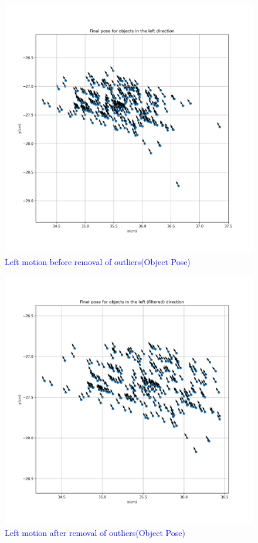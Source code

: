     \begin{figure}[H] 
            \centering \includegraphics[width=\textwidth]{"images/experiment_5/Final_pose_for_objects_in_the_left_direction.png"}
            \caption{\textcolor{blue}{Left motion before removal of outliers(Object Pose)}}
            \label{fig:exp05-left-end-poses-before}
    \end{figure}
    
    \begin{figure}[H] 
            \centering \includegraphics[width=\textwidth]{"images/experiment_5/Final_pose_for_objects_in_the_left (filtered)_direction.png"}
            \caption{\textcolor{blue}{Left motion after removal of outliers(Object Pose)}}
            \label{fig:exp05-left-end-poses-after}
    \end{figure}
    
